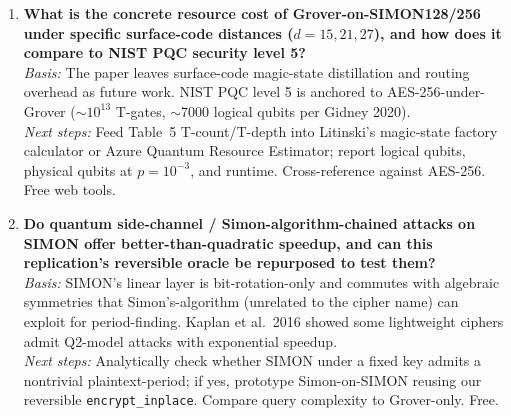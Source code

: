 \begin{enumerate}
\item \textbf{What is the concrete resource cost of Grover-on-SIMON128/256
under specific surface-code distances ($d{=}15, 21, 27$), and how does it
compare to NIST PQC security level 5?} \\
\emph{Basis:} The paper leaves surface-code magic-state distillation and
routing overhead as future work. NIST PQC level 5 is anchored to
AES-256-under-Grover ($\sim$$10^{13}$ T-gates, $\sim$7000 logical qubits per
Gidney 2020). \\
\emph{Next steps:} Feed Table~5 T-count/T-depth into Litinski's magic-state
factory calculator or Azure Quantum Resource Estimator; report logical
qubits, physical qubits at $p{=}10^{-3}$, and runtime. Cross-reference
against AES-256. Free web tools.

\item \textbf{Do quantum side-channel / Simon-algorithm-chained attacks on
SIMON offer better-than-quadratic speedup, and can this replication's
reversible oracle be repurposed to test them?} \\
\emph{Basis:} SIMON's linear layer is bit-rotation-only and commutes with
algebraic symmetries that Simon's-algorithm (unrelated to the cipher name)
can exploit for period-finding. Kaplan et al.\ 2016 showed some lightweight
ciphers admit Q2-model attacks with exponential speedup. \\
\emph{Next steps:} Analytically check whether SIMON under a fixed key admits
a nontrivial plaintext-period; if yes, prototype Simon-on-SIMON reusing our
reversible \texttt{encrypt\_inplace}. Compare query complexity to Grover-only.
Free.

\end{enumerate}
